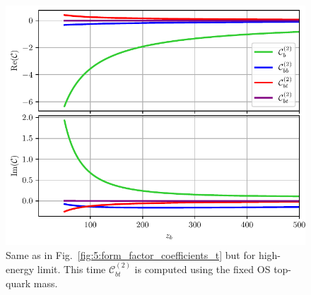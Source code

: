 \begin{figure}[h]
\centering
\includegraphics[width=\figurewidth]{Images/form_factor_coefficients_b.pdf}
\caption{Same as in Fig.~\ref{fig:5:form_factor_coefficients_t} but for high-energy limit. This time $\mathcal{C}_{bt}^{(2)}$ is computed using the fixed \acs{OS} top-quark mass.}
\label{fig:5:form_factor_coefficients_b}
\end{figure}
